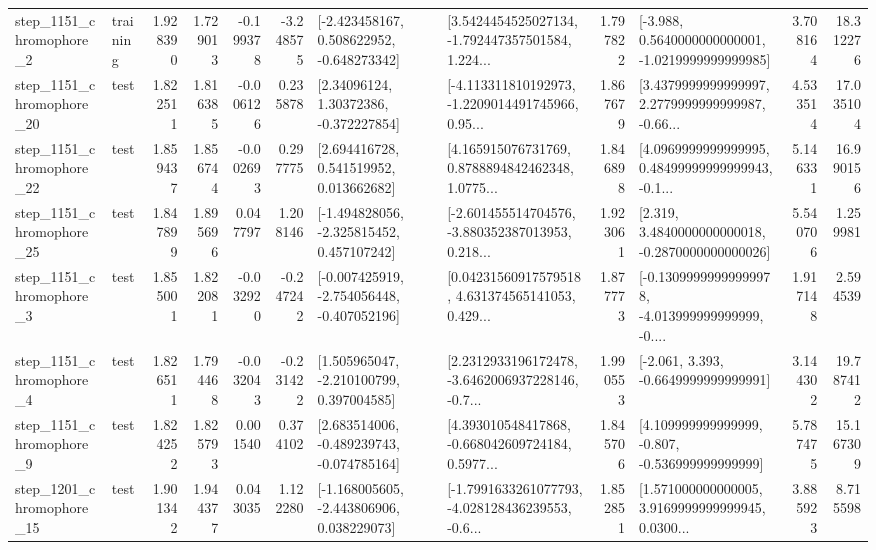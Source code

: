 \begin{tabular}{llrrrrllrlrr}
  step\_1151\_chromophore\_2 &  training &      1.928390 &    1.729013 &     -0.199378 & -3.248575 &   [-2.423458167, 0.508622952, -0.648273342] &  [3.5424454525027134, -1.792447357501584, 1.224... &       1.797822 &  [-3.988, 0.5640000000000001, -1.0219999999999985] &            3.708164 &         18.312276 \\
 step\_1151\_chromophore\_20 &      test &      1.822511 &    1.816385 &     -0.006126 &  0.235878 &      [2.34096124, 1.30372386, -0.372227854] &  [-4.113311810192973, -1.2209014491745966, 0.95... &       1.867679 &  [3.4379999999999997, 2.2779999999999987, -0.66... &            4.533514 &         17.035104 \\
 step\_1151\_chromophore\_22 &      test &      1.859437 &    1.856744 &     -0.002693 &  0.297775 &     [2.694416728, 0.541519952, 0.013662682] &  [4.165915076731769, 0.8788894842462348, 1.0775... &       1.846898 &  [4.0969999999999995, 0.48499999999999943, -0.1... &            5.146331 &         16.990156 \\
 step\_1151\_chromophore\_25 &      test &      1.847899 &    1.895696 &      0.047797 &  1.208146 &   [-1.494828056, -2.325815452, 0.457107242] &  [-2.601455514704576, -3.880352387013953, 0.218... &       1.923061 &   [2.319, 3.4840000000000018, -0.2870000000000026] &            5.540706 &          1.259981 \\
  step\_1151\_chromophore\_3 &      test &      1.855001 &    1.822081 &     -0.032920 & -0.247242 &  [-0.007425919, -2.754056448, -0.407052196] &  [0.04231560917579518, 4.631374565141053, 0.429... &       1.877773 &  [-0.13099999999999978, -4.013999999999999, -0.... &            1.917148 &          2.594539 \\
  step\_1151\_chromophore\_4 &      test &      1.826511 &    1.794468 &     -0.032043 & -0.231422 &    [1.505965047, -2.210100799, 0.397004585] &  [2.2312933196172478, -3.6462006937228146, -0.7... &       1.990553 &               [-2.061, 3.393, -0.6649999999999991] &            3.144302 &         19.787412 \\
  step\_1151\_chromophore\_9 &      test &      1.824252 &    1.825793 &      0.001540 &  0.374102 &   [2.683514006, -0.489239743, -0.074785164] &  [4.393010548417868, -0.668042609724184, 0.5977... &       1.845706 &    [4.109999999999999, -0.807, -0.536999999999999] &            5.787475 &         15.167309 \\
 step\_1201\_chromophore\_15 &      test &      1.901342 &    1.944377 &      0.043035 &  1.122280 &   [-1.168005605, -2.443806906, 0.038229073] &  [-1.7991633261077793, -4.028128436239553, -0.6... &       1.852851 &  [1.571000000000005, 3.9169999999999945, 0.0300... &            3.885923 &          8.715598 \\

\end{tabular}
